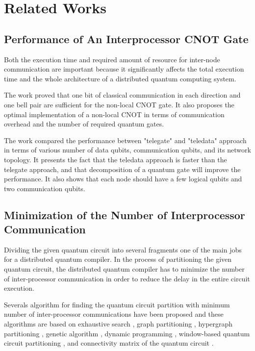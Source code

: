 \chapter{Related Works}
\label{related works}

\section{Performance of  An Interprocessor CNOT Gate}
Both the execution time and required amount of resource for inter-node communication are important because it significantly affects the total execution time and the whole architecture of a distributed quantum computing system. 

 The work \cite{gateteleportation} proved that one bit of classical communication in each direction and one bell pair are sufficient for the non-local CNOT gate.  It also proposes the optimal implementation of a non-local CNOT in terms of communication overhead and the number of required quantum gates. 
 
 The work \cite{arithmetic} compared the performance between "telegate" and "teledata" approach in terms of various number of data qubits, communication qubits, and its network topology.  It presents the fact that the teledata approach is faster than the telegate approach, and that decomposition of a quantum gate will improve the performance.  It also shows that each node should have a few logical qubits and two communication qubits.

\section{Minimization of the Number of Interprocessor Communication}

Dividing the given quantum circuit into several fragments one of the main jobs for a distributed quantum compiler.  In the process of partitioning the given quantum circuit, the distributed quantum compiler has to minimize the number of inter-processor communication in order to reduce the delay in the entire circuit execution.  

Severals algorithm for finding the quantum circuit partition with minimum number of inter-processor communications have been proposed and these algorithms are based on exhaustive search  \cite{exhaustivesearch}, graph partitioning \cite{Kernighahn-Lin}, hypergraph partitioning \cite{hypergraph}, genetic algorithm \cite{genetic}, dynamic programming \cite{dynamic}, window-based quantum circuit partitioning \cite{WQCP} , and connectivity matrix of the quantum circuit \cite{matrix}.


